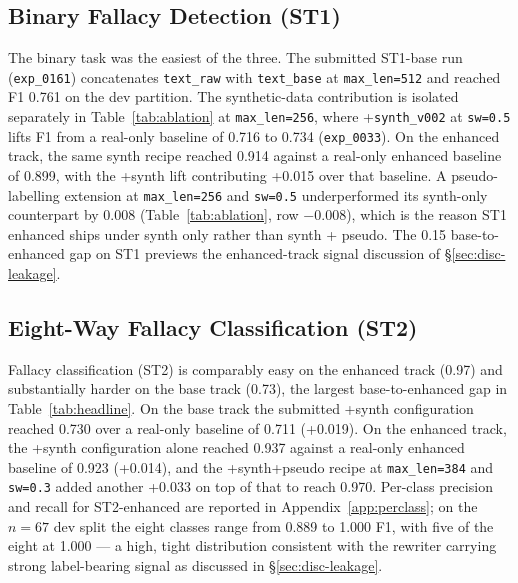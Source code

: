 \subsection{Binary Fallacy Detection (ST1)}
\label{sec:results-st1}

The binary task was the easiest of the three. The submitted ST1-base run (\texttt{exp\_0161}) concatenates \texttt{text\_raw} with \texttt{text\_base} at \texttt{max\_len=512} and reached F1 0.761 on the dev partition. The synthetic-data contribution is isolated separately in Table~\ref{tab:ablation} at \texttt{max\_len=256}, where +\texttt{synth\_v002} at \texttt{sw=0.5} lifts F1 from a real-only baseline of 0.716 to 0.734 (\texttt{exp\_0033}). %
On the enhanced track, the same synth recipe reached 0.914 against a real-only enhanced baseline of 0.899, with the +synth lift contributing +0.015 over that baseline. %
A pseudo-labelling extension at \texttt{max\_len=256} and \texttt{sw=0.5} underperformed its synth-only counterpart by 0.008 (Table~\ref{tab:ablation}, row $-$0.008), which is the reason ST1 enhanced ships under synth only rather than synth + pseudo. %
The 0.15 base-to-enhanced gap on ST1 previews the enhanced-track signal discussion of \S\ref{sec:disc-leakage}.

\subsection{Eight-Way Fallacy Classification (ST2)}
\label{sec:results-st2}

Fallacy classification (ST2) is comparably easy on the enhanced track (0.97) and substantially harder on the base track (0.73), the largest base-to-enhanced gap in Table~\ref{tab:headline}. On the base track the submitted +synth configuration reached 0.730 over a real-only baseline of 0.711 (+0.019). %
On the enhanced track, the +synth configuration alone reached 0.937 against a real-only enhanced baseline of 0.923 (+0.014), and the +synth+pseudo recipe at \texttt{max\_len=384} and \texttt{sw=0.3} added another +0.033 on top of that to reach 0.970. %
Per-class precision and recall for ST2-enhanced are reported in Appendix~\ref{app:perclass}; on the $n=67$ dev split the eight classes range from 0.889 to 1.000 F1, with five of the eight at 1.000 --- a high, tight distribution consistent with the rewriter carrying strong label-bearing signal as discussed in \S\ref{sec:disc-leakage}.

